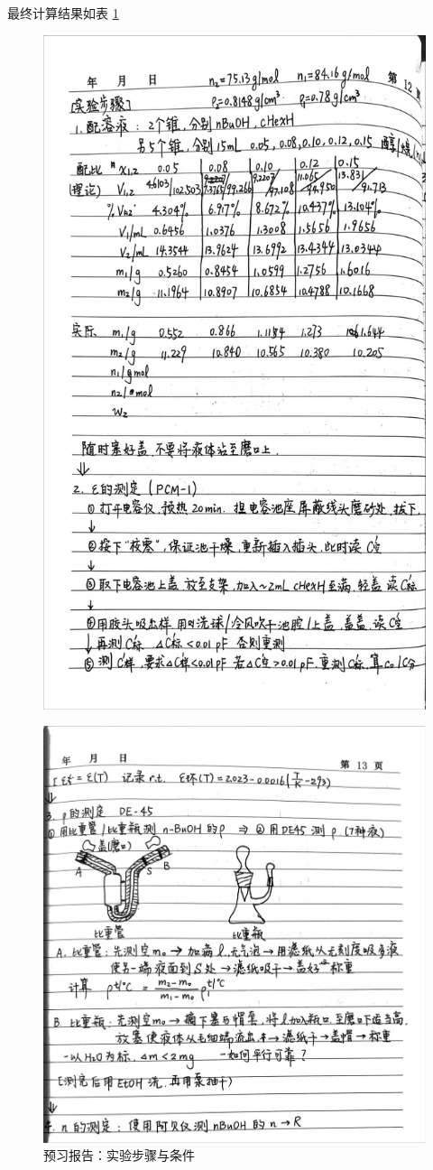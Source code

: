 \documentclass[cn,hazy,pku,12pt,normal,math=newtx,cite=super]{elegantnote}
\begin{document}
最终计算结果如表 \ref{fig:1}
\begin{figure}[htbp]
    \centering
    \includegraphics[width=.8\textwidth]{figures/0-3-1.jpg}
\end{figure}

\begin{figure}[htbp]
    \centering
    \includegraphics[width=.8\textwidth]{figures/0-3-2.jpg}
    \caption{预习报告：实验步骤与条件}
    \label{fig:1}
\end{figure}
\end{document}
